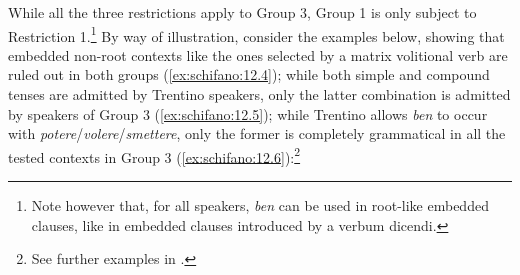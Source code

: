 \documentclass[output=paper]{langsci/langscibook}
\begin{document}
While all the three restrictions apply to Group 3, Group 1 is only subject to
Restriction 1.\footnote{Note however that, for all speakers, \emph{ben} can be
used in root-like embedded clauses, like in embedded clauses introduced by a
verbum dicendi.}  By way of illustration, consider the examples below,
showing that embedded non-root contexts like the ones selected by a matrix
volitional verb are ruled out in both groups (\ref{ex:schifano:12.4}); while both simple and
compound tenses are admitted by Trentino speakers, only the latter combination
is admitted by speakers of Group 3 (\ref{ex:schifano:12.5}); while Trentino allows \emph{ben} to
occur with \emph{potere}\slash\emph{volere}\slash\emph{smettere}, only the former is
completely grammatical in all the tested contexts in Group 3 (\ref{ex:schifano:12.6}):\footnote{See
further examples in \textcite{CognSchi2018b,CognSchi2018}.}
\end{document}
